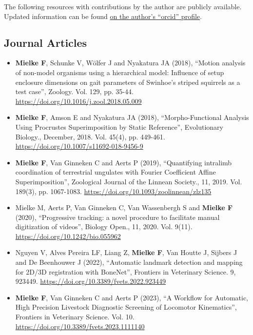 \begin{change}
The following resources with contributions by the author are publicly available.
Updated information can be found \href{https://orcid.org/0000-0003-3229-0981}{on the author's ``orcid'' profile}.
\subsection{Journal Articles}
\label{sec:org14c08d8}

\begin{itemize}
\item \textbf{Mielke F}, Schunke V, Wölfer J and Nyakatura JA (2018), ``Motion analysis of non-model organisms using a hierarchical model: Influence of setup enclosure dimensions on gait parameters of Swinhoe’s striped squirrels as a test case'', Zoology. Vol. 129, pp. 35-44. \url{https://doi.org/10.1016/j.zool.2018.05.009}

\item \textbf{Mielke F}, Amson E and Nyakatura JA (2018), ``Morpho-Functional Analysis Using Procrustes Superimposition by Static Reference'', Evolutionary Biology., December, 2018. Vol. 45(4), pp. 449-461. \url{https://doi.org/10.1007/s11692-018-9456-9}

\item \textbf{Mielke F}, Van Ginneken C and Aerts P (2019), ``Quantifying intralimb coordination of terrestrial ungulates with Fourier Coefficient Affine Superimposition'', Zoological Journal of the Linnean Society., 11, 2019. Vol. 189(3), pp. 1067-1083. \url{https://doi.org/10.1093/zoolinnean/zlz135}

\item Mielke M, Aerts P, Van Ginneken C, Van Wassenbergh S and \textbf{Mielke F} (2020), ``Progressive tracking: a novel procedure to facilitate manual digitization of videos'', Biology Open., 11, 2020. Vol. 9(11). \url{https://doi.org/10.1242/bio.055962}

\item Nguyen V, Alves Pereira LF, Liang Z, \textbf{Mielke F}, Van Houtte J, Sijbers J and De Beenhouwer J (2022), ``Automatic landmark detection and mapping for 2D/3D registration with BoneNet'', Frontiers in Veterinary Science. 9, 923449. \url{https://doi.org/10.3389/fvets.2022.923449}

\item \textbf{Mielke F}, Van Ginneken C and Aerts P (2023), ``A Workflow for Automatic, High Precision Livestock Diagnostic Screening of Locomotor Kinematics'', Frontiers in Veterinary Science. Vol. 10. \url{https://doi.org/10.3389/fvets.2023.1111140}


\end{itemize}
\end{change}

